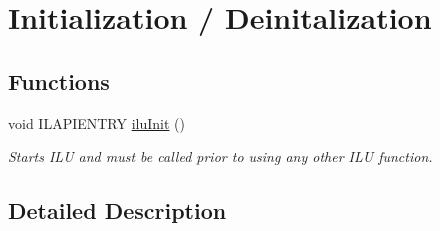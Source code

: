 \hypertarget{group__ilu__setup}{\section{Initialization / Deinitalization}
\label{group__ilu__setup}
}
\subsection*{Functions}
\begin{DoxyCompactItemize}
\item 
\hypertarget{group__ilu__setup_ga93e0f1da1027ae92b2218963f1bfd334}{void I\+L\+A\+P\+I\+E\+N\+T\+R\+Y \hyperlink{group__ilu__setup_ga93e0f1da1027ae92b2218963f1bfd334}{ilu\+Init} ()}\label{group__ilu__setup_ga93e0f1da1027ae92b2218963f1bfd334}

\begin{DoxyCompactList}\small\item\em Starts I\+L\+U and must be called prior to using any other I\+L\+U function. \end{DoxyCompactList}\end{DoxyCompactItemize}


\subsection{Detailed Description}
